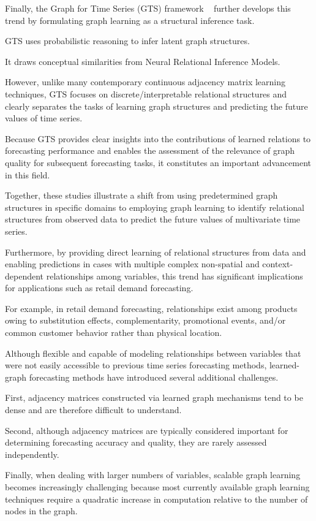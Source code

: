 Finally, the Graph for Time Series (GTS) framework ~\cite{shang2021discretegraphstructurelearning} further develops this trend by formulating graph learning as a structural inference task. 

GTS uses probabilistic reasoning to infer latent graph structures. 

It draws conceptual similarities from Neural Relational Inference Models. 

However, unlike many contemporary continuous adjacency matrix learning techniques, GTS focuses on discrete/interpretable relational structures and clearly separates the tasks of learning graph structures and predicting the future values of time series. 

Because GTS provides clear insights into the contributions of learned relations to forecasting performance and enables the assessment of the relevance of graph quality for subsequent forecasting tasks, it constitutes an important advancement in this field.

Together, these studies illustrate a shift from using predetermined graph structures in specific domains to employing graph learning to identify relational structures from observed data to predict the future values of multivariate time series. 

Furthermore, by providing direct learning of relational structures from data and enabling predictions in cases with multiple complex non-spatial and context-dependent relationships among variables, this trend has significant implications for applications such as retail demand forecasting. 

For example, in retail demand forecasting, relationships exist among products owing to substitution effects, complementarity, promotional events, and/or common customer behavior rather than physical location.

Although flexible and capable of modeling relationships between variables that were not easily accessible to previous time series forecasting methods, learned-graph forecasting methods have introduced several additional challenges. 

First, adjacency matrices constructed via learned graph mechanisms tend to be dense and are therefore difficult to understand. 

Second, although adjacency matrices are typically considered important for determining forecasting accuracy and quality, they are rarely assessed independently. 

Finally, when dealing with larger numbers of variables, scalable graph learning becomes increasingly challenging because most currently available graph learning techniques require a quadratic increase in computation relative to the number of nodes in the graph.

